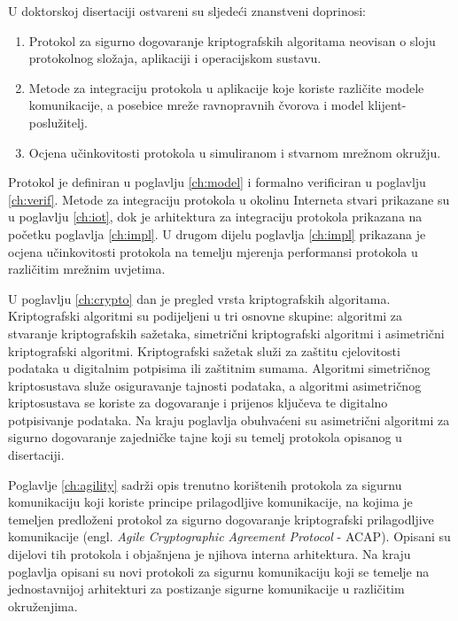 U doktorskoj disertaciji ostvareni su sljedeći znanstveni doprinosi:
\begin{enumerate}
\item Protokol za sigurno dogovaranje kriptografskih algoritama neovisan o sloju
protokolnog složaja, aplikaciji i operacijskom sustavu. 
\item Metode za integraciju protokola u aplikacije koje koriste različite modele
komunikacije, a posebice mreže ravnopravnih čvorova i model klijent-poslužitelj.
\item Ocjena učinkovitosti protokola u simuliranom i stvarnom mrežnom okružju.
\end{enumerate}

Protokol je definiran u poglavlju \ref{ch:model} i formalno verificiran u
poglavlju \ref{ch:verif}. Metode za integraciju protokola u okolinu Interneta
stvari prikazane su u poglavlju \ref{ch:iot}, dok je arhitektura za integraciju
protokola prikazana na početku poglavlja \ref{ch:impl}. U drugom dijelu
poglavlja \ref{ch:impl} prikazana je ocjena učinkovitosti protokola na temelju
mjerenja performansi protokola u različitim mrežnim uvjetima.

U poglavlju \ref{ch:crypto} dan je pregled vrsta kriptografskih algoritama.
Kriptografski algoritmi su podijeljeni u tri osnovne skupine: algoritmi za
stvaranje kriptografskih sažetaka, simetrični kriptografski algoritmi i
asimetrični kriptografski algoritmi.
Kriptografski sažetak služi za zaštitu cjelovitosti podataka u
digitalnim potpisima ili zaštitnim sumama. Algoritmi simetričnog
kriptosustava služe osiguravanje tajnosti podataka, a algoritmi asimetričnog
kriptosustava se koriste za dogovaranje i prijenos ključeva te digitalno
potpisivanje podataka. Na kraju poglavlja obuhvaćeni su asimetrični algoritmi za sigurno
dogovaranje zajedničke tajne koji su temelj protokola opisanog u disertaciji.

Poglavlje \ref{ch:agility} sadrži opis trenutno korištenih protokola za sigurnu
komunikaciju koji koriste principe prilagodljive komunikacije, na kojima je
temeljen predloženi protokol za sigurno dogovaranje kriptografski prilagodljive
komunikacije (engl. \emph{Agile Cryptographic Agreement Protocol} - ACAP).
Opisani su dijelovi tih protokola i objašnjena je njihova
interna arhitektura. Na kraju poglavlja opisani su novi protokoli za sigurnu
komunikaciju koji se temelje na jednostavnijoj arhitekturi za postizanje
sigurne komunikacije u različitim okruženjima.


